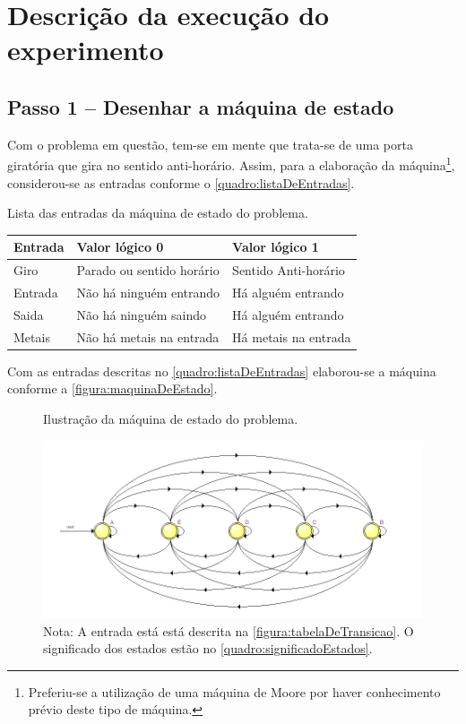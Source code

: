 \chapter{Descrição da execução do experimento}
	\section{Passo 1 – Desenhar a máquina de estado}
		Com o problema em questão, tem-se em mente que trata-se de uma porta giratória
		que gira no sentido anti-horário.
		Assim, para a elaboração da máquina\footnote{Preferiu-se a utilização de uma máquina de Moore
		por haver conhecimento prévio deste tipo de máquina.}, considerou-se as entradas conforme o
		\autoref{quadro:listaDeEntradas}.

		\begin{quadro}[H]
			\centering
			\caption{Lista das entradas da máquina de estado do problema.}
			\label{quadro:listaDeEntradas}
			\begin{tabular}{|l|l|l|}
			  \hline
			   \textbf{Entrada} & \textbf{Valor lógico 0}  & \textbf{Valor lógico 1}\\
			    \hline
				   Giro & Parado ou sentido horário & Sentido Anti-horário \\
			   	\hline
			   		Entrada & Não há ninguém entrando & Há alguém entrando \\
			    \hline
					Saida & Não há ninguém saindo & Há alguém entrando \\
			    \hline
			    	Metais & Não há metais na entrada & Há metais na entrada \\
			    \hline
			\end{tabular}
		\end{quadro}

		Com as entradas descritas no \autoref{quadro:listaDeEntradas} elaborou-se a máquina conforme a
		\autoref{figura:maquinaDeEstado}.

		\begin{figure}[H]
			 \centering
			 \caption{\label{figura:maquinaDeEstado}Ilustração da máquina de estado do problema.}
			 \includegraphics[width=1\textwidth]{img/maquinaDeEstados}
			 \caption*{Nota: A entrada está está descrita na \autoref{figura:tabelaDeTransicao}. O
			  significado dos estados estão no \autoref{quadro:significadoEstados}.}
		\end{figure}

